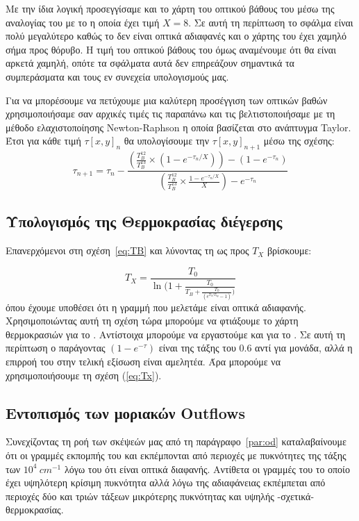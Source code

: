 \documentclass[a4paper,12pt]{memoir}
\begin{document}
Με την ίδια λογική προσεγγίσαμε και το χάρτη του οπτικού βάθους του  μέσω της αναλογίας του με το  η οποία έχει τιμή $X=8$. Σε αυτή τη περίπτωση το σφάλμα είναι πολύ μεγαλύτερο καθώς το  δεν είναι οπτικά αδιαφανές και ο χάρτης του  έχει χαμηλό σήμα προς θόρυβο. Η τιμή του οπτικού βάθους του  όμως αναμένουμε ότι θα είναι αρκετά χαμηλή, οπότε τα σφάλματα αυτά δεν επηρεάζουν σημαντικά τα συμπεράσματα και τους εν συνεχεία υπολογισμούς μας.

Για να μπορέσουμε να πετύχουμε μια καλύτερη προσέγγιση των οπτικών βαθών χρησιμοποιήσαμε σαν αρχικές τιμές τις παραπάνω και τις βελτιστοποιήσαμε με τη μέθοδο ελαχιστοποίησης Newton-Raphson η οποία βασίζεται στο ανάπτυγμα Taylor. Έτσι για κάθε τιμή $\tau[x,y] _n$ θα υπολογίσουμε την $\tau[x,y] _{n+1}$ μέσω της σχέσης:
\begin{equation}
\tau _{n+1} = \tau _n -\frac{\left( \frac{T_B ^{12}}{T_B ^{13}} \times (1-e^{-\tau _n/X}) \right)-(1-e^{-\tau _n} ) } {\left( \frac{T_B ^{12}}{T_B ^{13}} \times \frac{1-e^{-\tau _n /X}}{X} \right) -e^{-\tau _n}}
\end{equation}

\subsection{Υπολογισμός της Θερμοκρασίας διέγερσης}
Επανερχόμενοι στη σχέση~\ref{eq:TB} και λύνοντας τη ως προς $T_X$ βρίσκουμε:

\begin{equation}
\label{eq:Tx}
T_X=\frac{T_0}{\ln (1+\frac{T_0}{T_B+\frac{T_0}{( e^{T_0/T_{bg}}-1)})}}
\end{equation}
όπου έχουμε υποθέσει ότι η γραμμή που μελετάμε είναι οπτικά αδιαφανής. Χρησιμοποιώντας αυτή τη σχέση τώρα μπορούμε να φτιάξουμε το χάρτη θερμοκρασιών για το . 
Αντίστοιχα μπορούμε να εργαστούμε και για το . Σε αυτή τη περίπτωση ο παράγοντας $\left( 1-e^{-\tau} \right) $ είναι της τάξης του $0.6$ αντί για μονάδα, αλλά η επιρροή του στην τελική εξίσωση είναι αμελητέα. Άρα μπορούμε να χρησιμοποιήσουμε τη σχέση (\ref{eq:Tx}).


\subsection{Εντοπισμός των μοριακών Outflows}
\label{par:Outflow-Trace}
Συνεχίζοντας τη ροή των σκέψεών μας από τη παράγραφο~\ref{par:od} καταλαβαίνουμε ότι οι γραμμές εκπομπής του  και  εκπέμπονται από περιοχές με πυκνότητες της τάξης των $10^4\ cm^{-1}$ λόγω του ότι είναι οπτικά διαφανής.
Αντίθετα οι γραμμές του  το οποίο έχει υψηλότερη κρίσιμη πυκνότητα αλλά λόγω της αδιαφάνειας εκπέμπεται από περιοχές δύο και τριών τάξεων μικρότερης πυκνότητας και υψηλής -σχετικά- θερμοκρασίας.
\end{document}
